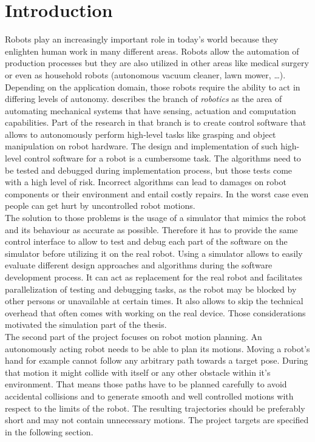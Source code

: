 
\chapter{Introduction}
\label{chap:introduction}

Robots play an increasingly important role in today's world because they enlighten human work in many different areas. Robots allow the automation of production processes but they are also utilized in other areas like medical surgery or even as household robots (autonomous vacuum cleaner, lawn mower, \ldots). Depending on the application domain, those robots require the ability to act in differing levels of autonomy. \citep{lavalle2006} describes the branch of \emph{robotics} as the area of automating mechanical systems that have sensing, actuation and computation capabilities. Part of the research in that branch is to create control software that allows to autonomously perform high-level tasks like grasping and object manipulation on robot hardware. The design and implementation of such high-level control software for a robot is a cumbersome task. The algorithms need to be tested and debugged during implementation process, but those tests come with a high level of risk. Incorrect algorithms can lead to damages on robot components or their environment and entail costly repairs. In the worst case even people can get hurt by uncontrolled robot motions.\\

The solution to those problems is the usage of a simulator that mimics the robot and its behaviour as accurate as possible. Therefore it has to provide the same control interface to allow to test and debug each part of the software on the simulator before utilizing it on the real robot. Using a simulator allows to easily evaluate different design approaches and algorithms during the software development process. It can act as replacement for the real robot and facilitates parallelization of testing and debugging tasks, as the robot may be blocked by other persons or unavailable at certain times. It also allows to skip the technical overhead that often comes with working on the real device. Those considerations motivated the simulation part of the thesis. \\

The second part of the project focuses on robot motion planning. An autonomously acting robot needs to be able to plan its motions. Moving a robot's hand for example cannot follow any arbitrary path towards a target pose. During that motion it might collide with itself or any other obstacle within it's environment. That means those paths have to be planned carefully to avoid accidental collisions and to generate smooth and well controlled motions with respect to the limits of the robot. The resulting trajectories should be preferably short and may not contain unnecessary motions. The project targets are specified in the following section.

